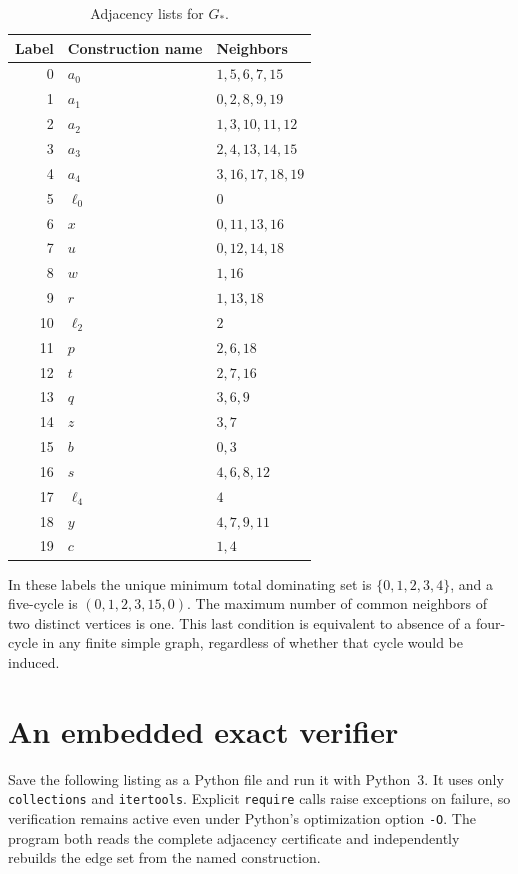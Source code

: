 \documentclass[11pt,a4paper]{article}
\theoremstyle{definition}
\theoremstyle{remark}
\newcommand{\Gstar}{G_{\ast}}
\newcommand{\code}[1]{\texttt{#1}}
\begin{document}
\begin{table}[htbp]
\centering
\caption{Adjacency lists for $\Gstar$.}
\label{tab:adjacency}
\begin{tabular}{@{}rll@{}}
\toprule
Label & Construction name & Neighbors\\
\midrule
0 & $a_0$ & $1,5,6,7,15$\\
1 & $a_1$ & $0,2,8,9,19$\\
2 & $a_2$ & $1,3,10,11,12$\\
3 & $a_3$ & $2,4,13,14,15$\\
4 & $a_4$ & $3,16,17,18,19$\\
5 & $\ell_0$ & $0$\\
6 & $x$ & $0,11,13,16$\\
7 & $u$ & $0,12,14,18$\\
8 & $w$ & $1,16$\\
9 & $r$ & $1,13,18$\\
10 & $\ell_2$ & $2$\\
11 & $p$ & $2,6,18$\\
12 & $t$ & $2,7,16$\\
13 & $q$ & $3,6,9$\\
14 & $z$ & $3,7$\\
15 & $b$ & $0,3$\\
16 & $s$ & $4,6,8,12$\\
17 & $\ell_4$ & $4$\\
18 & $y$ & $4,7,9,11$\\
19 & $c$ & $1,4$\\
\bottomrule
\end{tabular}
\end{table}

In these labels the unique minimum total dominating set is
$\{0,1,2,3,4\}$, and a five-cycle is
$(0,1,2,3,15,0)$.
The maximum number of common neighbors of two distinct vertices
is one. This last condition is equivalent to absence of a
four-cycle in any finite simple graph, regardless of whether that
cycle would be induced.

\section{An embedded exact verifier}
\label{app:code}

Save the following listing as a Python file and run it with
Python~3. It uses only \code{collections} and \code{itertools}.
Explicit \code{require} calls raise exceptions on failure, so
verification remains active even under Python's optimization
option \code{-O}. The program both reads the complete adjacency
certificate and independently rebuilds the edge set from the
named construction.
\end{document}
